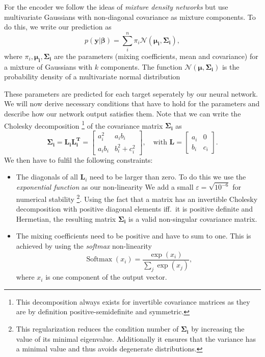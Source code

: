 \documentclass[nobib, a4paper]{tufte-handout}
\begin{document}
For the encoder we follow the ideas of \textit{mixture density networks} but use multivariate Gaussians with non-diagonal covariance as mixture components\autocite{mdn}.
To do this, we write our prediction as
\begin{equation*}
p \left( \bm{y} | \bm{\beta} \right) = \sum_{i}^n \pi_i \mathcal{N} \left( \bm{\mu_i}, \bm{\Sigma_i} \right),
\end{equation*}
where \(\pi_i, \bm{\mu_i}, \bm{\Sigma_i}\) are the parameters (mixing coefficients, mean and covariance) for a mixture of Gaussians with \(k\) components.
The function \(\mathcal{N}(\bm{\mu}, \bm{\Sigma_i})\) is the probability density of a multivariate normal distribution 

These parameters are predicted for each target seperately by our neural network.
We will now derive necessary conditions that have to hold for the parameters and describe how our network output satisfies them.
Note that we can write the Cholesky decomposition%
\footnote{This decomposition always exists for invertible covariance matrices as they are by definition positive-semidefinite and symmetric.}
of the covariance matrix \(\bm{\Sigma_i}\) as
\begin{equation*}
  \bm{\Sigma_i} = \bm{L_i} \bm{L_i^T} =
  \begin{bmatrix}
    a_i^2 & a_ib_i \\
    a_ib_i & b_i^2 + c_i^2
  \end{bmatrix} ,\quad
   \text{with } \bm{L} =
   \begin{bmatrix}
     a_i & 0 \\
     b_i & c_i
   \end{bmatrix}.
\end{equation*}
We then have to fulfil the following constraints:
\begin{itemize}
\item The diagonals of all \(\bm{L}_i\) need to be larger than zero.
  To do this we use the \textit{exponential function} as our non-linearity
  We add a small \(\varepsilon = \sqrt{10^{-6}}\) for numerical stability%
  \footnote{This regularization reduces the condition number of \(\bm{\Sigma_i}\) by increasing the value of its minimal eigenvalue.
  Additionally it ensures that the variance has a minimal value and thus avoids degenerate distributions.}. %
  Using the fact that a matrix has an invertible Cholesky decomposition with positive diagonal elements iff.\ it is positive definite and Hermetian,
  the resulting matrix \(\bm{\Sigma_i}\) is a valid non-singular covariance matrix.
\item The mixing coefficients need to be positive and have to sum to one.
  This is achieved by using the \textit{softmax} non-linearity
  \begin{equation*}
    \operatorname{Softmax} (x_i) = \frac{\exp (x_i)}{\sum_j \exp (x_j)},
  \end{equation*}
  where \(x_i\) is one component of the output vector.
\end{itemize}
\end{document}
